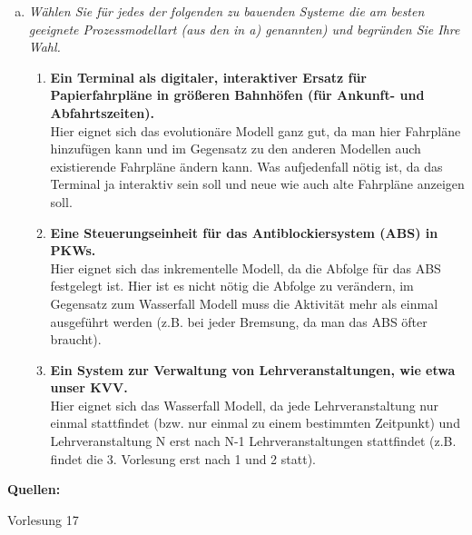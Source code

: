 \begin{enumerate}[(a)]
    \item {\itshape Wählen Sie für jedes der folgenden zu bauenden Systeme die am besten geeignete
    Prozessmodellart (aus den in a) genannten) und begründen Sie Ihre Wahl.}
    \begin{enumerate}[1]
    \item \textbf{Ein Terminal als digitaler, interaktiver Ersatz für Papierfahrpläne in größeren Bahnhöfen (für Ankunft- und Abfahrtszeiten).}\\
    Hier eignet sich das evolutionäre Modell ganz gut, da man hier Fahrpläne hinzufügen kann und im Gegensatz zu den anderen Modellen auch existierende Fahrpläne ändern kann. Was aufjedenfall nötig ist, da das Terminal ja interaktiv sein soll und neue wie auch alte Fahrpläne anzeigen soll.
    \item \textbf{Eine Steuerungseinheit für das Antiblockiersystem (ABS) in PKWs.}\\
    Hier  eignet sich das inkrementelle Modell, da die Abfolge für das ABS festgelegt ist. Hier ist es nicht nötig die Abfolge zu verändern, im Gegensatz zum Wasserfall Modell muss die Aktivität mehr als einmal ausgeführt werden (z.B. bei jeder Bremsung, da man das ABS öfter braucht).
    \item \textbf{Ein System zur Verwaltung von Lehrveranstaltungen, wie etwa unser KVV.}\\
    Hier eignet sich das Wasserfall Modell, da jede Lehrveranstaltung nur einmal stattfindet (bzw. nur einmal zu einem bestimmten Zeitpunkt) und Lehrveranstaltung N erst nach N-1 Lehrveranstaltungen stattfindet (z.B. findet die 3. Vorlesung erst nach 1 und 2 statt).
    \end{enumerate}
   


    
\end{enumerate}
\textbf{Quellen:}
\begin{enumerate}[{[1]}]
    \item Vorlesung 17
\end{enumerate}

